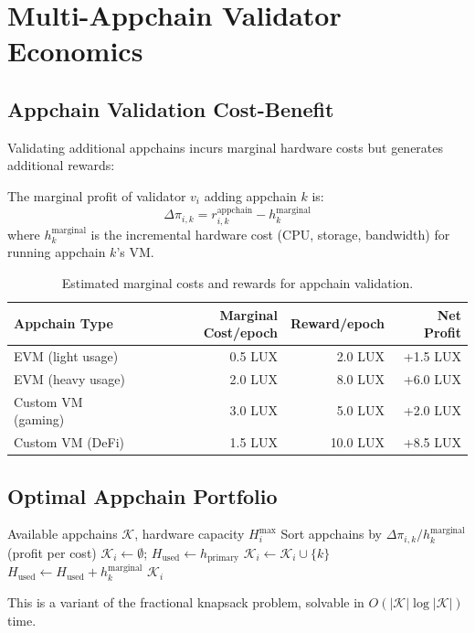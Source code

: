 \section{Multi-Appchain Validator Economics}
\label{sec:multiappchain}

\subsection{Appchain Validation Cost-Benefit}

Validating additional appchains incurs marginal hardware costs but generates additional rewards:

\begin{definition}
The marginal profit of validator $v_i$ adding appchain $k$ is:
\begin{equation}
    \Delta\pi_{i,k} = r_{i,k}^{\text{appchain}} - h_k^{\text{marginal}}
\end{equation}
where $h_k^{\text{marginal}}$ is the incremental hardware cost (CPU, storage, bandwidth) for running appchain $k$'s VM.
\end{definition}

\begin{table}[H]
\centering
\caption{Estimated marginal costs and rewards for appchain validation.}
\label{tab:appchain_economics}
\begin{tabular}{lrrr}
\toprule
\textbf{Appchain Type} & \textbf{Marginal Cost/epoch} & \textbf{Reward/epoch} & \textbf{Net Profit} \\
\midrule
EVM (light usage) & 0.5 LUX & 2.0 LUX & +1.5 LUX \\
EVM (heavy usage) & 2.0 LUX & 8.0 LUX & +6.0 LUX \\
Custom VM (gaming) & 3.0 LUX & 5.0 LUX & +2.0 LUX \\
Custom VM (DeFi) & 1.5 LUX & 10.0 LUX & +8.5 LUX \\
\bottomrule
\end{tabular}
\end{table}

\subsection{Optimal Appchain Portfolio}

\begin{algorithm}[H]
\caption{Optimal Appchain Selection for Validator $v_i$}
\label{alg:appchain_selection}
\begin{algorithmic}[1]
\Require Available appchains $\mathcal{K}$, hardware capacity $H_i^{\max}$
\State Sort appchains by $\Delta\pi_{i,k} / h_k^{\text{marginal}}$ (profit per cost)
\State $\mathcal{K}_i \gets \emptyset$; $H_{\text{used}} \gets h_{\text{primary}}$
        \State $\mathcal{K}_i \gets \mathcal{K}_i \cup \{k\}$
        \State $H_{\text{used}} \gets H_{\text{used}} + h_k^{\text{marginal}}$
    \EndIf
\EndFor
\State \Return $\mathcal{K}_i$
\end{algorithmic}
\end{algorithm}

This is a variant of the fractional knapsack problem, solvable in $O(|\mathcal{K}| \log |\mathcal{K}|)$ time.

